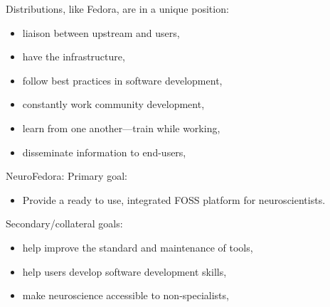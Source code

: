\begin{frame}[c]{Distributions, like Fedora, are in a unique position:}
  \begin{itemize}
    \item \alert{liaison between upstream and users},
    \item have the \alert{infrastructure},
    \item \alert{follow best practices} in software development,
    \item constantly \alert{work community development},
    \item \alert{learn from one another}---train while working,
    \item \alert{disseminate} information to end-users,
  \end{itemize}
\end{frame}
\begin{frame}[c]{NeuroFedora:}
  \textcolor{FedoraBlue}{Primary goal:}
  \begin{itemize}
    \item Provide a \alert{ready to use, integrated FOSS platform} for neuroscientists\footnotemark[7].
  \end{itemize}
  \pause{}
  \textcolor{FirstGreen}{Secondary/collateral goals:}
  \pause{}
  \begin{itemize}
    \item help \alert{improve the standard and maintenance} of tools,
    \item help users \alert{develop software development skills},
    \item \alert{make neuroscience accessible} to non-specialists,
  \end{itemize}
\end{frame}
